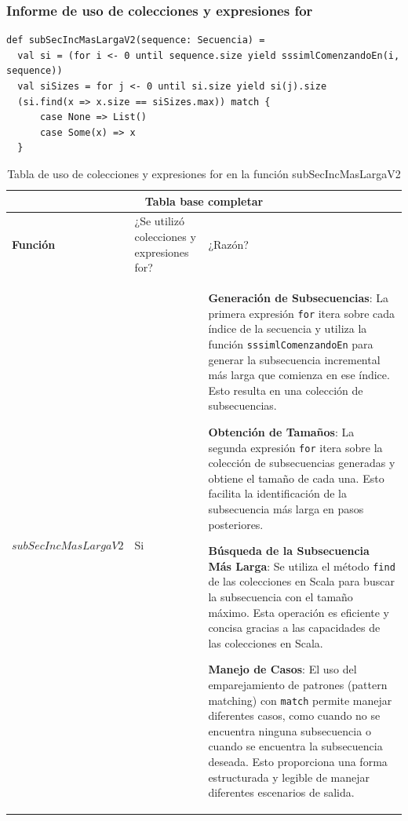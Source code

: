 \documentclass[12pt, a4paper]{article}
\begin{document}
\subsubsection{Informe de uso de colecciones y expresiones for}
\begin{lstlisting}[caption=Código en Scala para la funcion subSecIncMasLargaV2, label=lst:scala_code]
def subSecIncMasLargaV2(sequence: Secuencia) = 
  val si = (for i <- 0 until sequence.size yield sssimlComenzandoEn(i, sequence))
  val siSizes = for j <- 0 until si.size yield si(j).size
  (si.find(x => x.size == siSizes.max)) match {
      case None => List()
      case Some(x) => x 
  }
                          \end{lstlisting}
\begin{table}[H]
    \scriptsize
   \begin{tabular}{ |p{4cm}|p{3cm}|p{5.5cm}|  }
    \hline
    \multicolumn{3}{|c|}{Tabla base completar} \\
    \hline
    \textbf{Función}& ¿Se utilizó colecciones y expresiones for?  & ¿Razón?\\
    \hline
    $subSecIncMasLargaV2$ & Si &  
       \textbf{Generación de Subsecuencias}: La primera expresión \texttt{for} itera sobre cada índice de la secuencia y utiliza la función \texttt{sssimlComenzandoEn} para generar la subsecuencia incremental más larga que comienza en ese índice. Esto resulta en una colección de subsecuencias.
  
       \textbf{Obtención de Tamaños}: La segunda expresión \texttt{for} itera sobre la colección de subsecuencias generadas y obtiene el tamaño de cada una. Esto facilita la identificación de la subsecuencia más larga en pasos posteriores.
  
       \textbf{Búsqueda de la Subsecuencia Más Larga}: Se utiliza el método \texttt{find} de las colecciones en Scala para buscar la subsecuencia con el tamaño máximo. Esta operación es eficiente y concisa gracias a las capacidades de las colecciones en Scala.
  
       \textbf{Manejo de Casos}: El uso del emparejamiento de patrones (pattern matching) con \texttt{match} permite manejar diferentes casos, como cuando no se encuentra ninguna subsecuencia o cuando se encuentra la subsecuencia deseada. Esto proporciona una forma estructurada y legible de manejar diferentes escenarios de salida.
   \\
     \hline
   \end{tabular}
   \centering
   \caption{Tabla de uso de colecciones y expresiones for en la función subSecIncMasLargaV2}
   \end{table}
\end{document}
